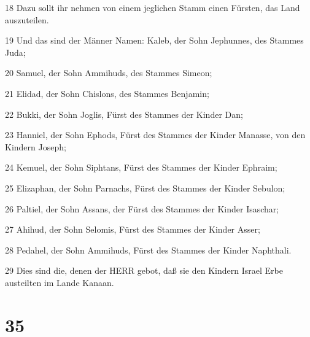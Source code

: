 \par 18 Dazu sollt ihr nehmen von einem jeglichen Stamm einen Fürsten, das Land auszuteilen.
\par 19 Und das sind der Männer Namen: Kaleb, der Sohn Jephunnes, des Stammes Juda;
\par 20 Samuel, der Sohn Ammihuds, des Stammes Simeon;
\par 21 Elidad, der Sohn Chislons, des Stammes Benjamin;
\par 22 Bukki, der Sohn Joglis, Fürst des Stammes der Kinder Dan;
\par 23 Hanniel, der Sohn Ephods, Fürst des Stammes der Kinder Manasse, von den Kindern Joseph;
\par 24 Kemuel, der Sohn Siphtans, Fürst des Stammes der Kinder Ephraim;
\par 25 Elizaphan, der Sohn Parnachs, Fürst des Stammes der Kinder Sebulon;
\par 26 Paltiel, der Sohn Assans, der Fürst des Stammes der Kinder Isaschar;
\par 27 Ahihud, der Sohn Selomis, Fürst des Stammes der Kinder Asser;
\par 28 Pedahel, der Sohn Ammihuds, Fürst des Stammes der Kinder Naphthali.
\par 29 Dies sind die, denen der HERR gebot, daß sie den Kindern Israel Erbe austeilten im Lande Kanaan.

\chapter{35}

